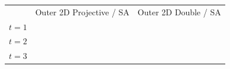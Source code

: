 \documentclass{standalone}
\begin{document}
\centering
\begin{tabular}{ccc}
        & \small{Outer 2D Projective / SA}                                               & \small{Outer 2D Double / SA}                                                     \\
  $t=1$ & \makecell{} & \makecell{} \\
  $t=2$ & \makecell{} & \makecell{} \\
  $t=3$ & \makecell{} & \makecell{} \\
\end{tabular}
\end{document}
